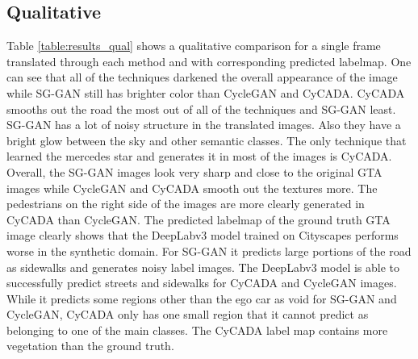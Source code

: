 \subsection{Qualitative}
Table \ref{table:results_qual} shows a qualitative comparison for a single frame translated through each method and with corresponding predicted labelmap. One can see that all of the techniques darkened the overall appearance of the image while SG-GAN still has brighter color than CycleGAN and CyCADA. CyCADA smooths out the road the most out of all of the techniques and SG-GAN least. SG-GAN has a lot of noisy structure in the translated images. Also they have a bright glow between the sky and other semantic classes. The only technique that learned the mercedes star and generates it in most of the images is CyCADA. Overall, the SG-GAN images look very sharp and close to the original GTA images while CycleGAN and CyCADA smooth out the textures more. The pedestrians on the right side of the images are more clearly generated in CyCADA than CycleGAN. The predicted labelmap of the ground truth GTA image clearly shows that the DeepLabv3 model trained on Cityscapes performs worse in the synthetic domain. For SG-GAN it predicts large portions of the road as sidewalks and generates noisy label images. The DeepLabv3 model is able to successfully predict streets and sidewalks for CyCADA and CycleGAN images. While it predicts some regions other than the ego car as void for SG-GAN and CycleGAN, CyCADA only has one small region that it cannot predict as belonging to one of the main classes. The CyCADA label map contains more vegetation than the ground truth. 







